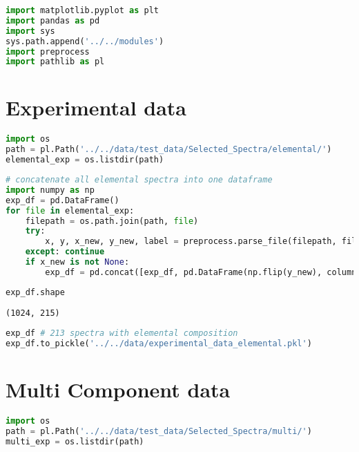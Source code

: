 \begin{lstlisting}[language=Python]
import matplotlib.pyplot as plt
import pandas as pd
import sys
sys.path.append('../../modules')
import preprocess
import pathlib as pl
\end{lstlisting}

\hypertarget{experimental-data}{%
\section*{Experimental data}\label{experimental-data}}

\begin{lstlisting}[language=Python]
import os
path = pl.Path('../../data/test_data/Selected_Spectra/elemental/')
elemental_exp = os.listdir(path)
\end{lstlisting}

\begin{lstlisting}[language=Python]
# concatenate all elemental spectra into one dataframe
import numpy as np
exp_df = pd.DataFrame()
for file in elemental_exp:
    filepath = os.path.join(path, file)
    try:
        x, y, x_new, y_new, label = preprocess.parse_file(filepath, filetype='vms', scale=True, N_points=1024)
    except: continue
    if x_new is not None:
        exp_df = pd.concat([exp_df, pd.DataFrame(np.flip(y_new), columns=['_'.join(label)])], axis=1)
\end{lstlisting}

\begin{lstlisting}[language=Python]
exp_df.shape
\end{lstlisting}

\begin{lstlisting}
(1024, 215)
\end{lstlisting}

\begin{lstlisting}[language=Python]
exp_df # 213 spectra with elemental composition
exp_df.to_pickle('../../data/experimental_data_elemental.pkl')
\end{lstlisting}

\hypertarget{multi-component-data}{%
\section*{Multi Component data}\label{multi-component-data}}

\begin{lstlisting}[language=Python]
import os
path = pl.Path('../../data/test_data/Selected_Spectra/multi/')
multi_exp = os.listdir(path)
\end{lstlisting}

